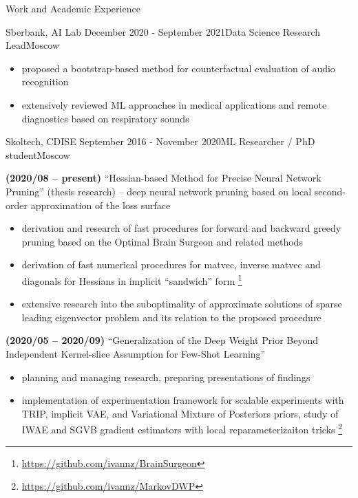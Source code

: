 \documentclass{resume} %
\begin{document}
\begin{rSection}{Work and Academic Experience}
\begin{rSubsection}{
        Sberbank, AI Lab
    }{December 2020 - September 2021}{Data Science Research Lead}{Moscow}
\begin{itemize}
        \item proposed a bootstrap-based method for counterfactual evaluation of audio recognition

        \item extensively reviewed ML approaches in medical applications and remote diagnostics based on respiratory sounds
    \end{itemize}
\end{rSubsection}

\begin{rSubsection}{
        Skoltech, CDISE
    }{September 2016 - November 2020}{ML Researcher / PhD student}{Moscow}

    \item \textbf{(2020/08 -- present)}
    ``Hessian-based Method for Precise Neural Network Pruning'' (thesis research) -- deep neural network pruning based on local second-order approximation of the loss surface
    \begin{itemize}
        \item derivation and research of fast procedures for forward and backward greedy pruning based on the Optimal Brain Surgeon and related methods

        \item derivation of fast numerical procedures for matvec, inverse matvec and diagonals for Hessians in implicit ``sandwich'' form%
        \footnote{
            \url{https://github.com/ivannz/BrainSurgeon}
        }

        \item extensive research into the suboptimality of approximate solutions of sparse leading eigenvector problem and its relation to the proposed procedure
    \end{itemize}

    \item \textbf{(2020/05 -- 2020/09)}
    ``Generalization of the Deep Weight Prior Beyond Independent Kernel-slice Assumption for Few-Shot Learning''
    \begin{itemize}
        \item planning and managing research, preparing presentations of findings

        \item implementation of experimentation framework for scalable experiments with TRIP, implicit VAE, and Variational Mixture of Posteriors priors, study of IWAE and SGVB gradient estimators with local reparameterizaiton tricks%
        \footnote{
            \url{https://github.com/ivannz/MarkovDWP}
        }


\end{itemize}
\end{rSubsection}
\end{rSection}
\end{document}

